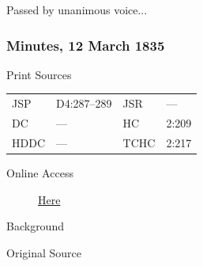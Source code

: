 				Passed by unanimous voice...
				
		\subsubsection{Minutes, 12 March 1835}
			\label{EMS-1835-JS-12-MAR-1835}
			
			\begin{description}
				\item[Print Sources]
			\end{description}

				\begin{tabular}{p{0.5in}p{1in}p{0.5in}p{1in}}
				JSP	 	& D4:287--289		& JSR 		& --- \\
				DC	 	& --- 				& HC 		& 2:209 \\
				HDDC 	& ---				& TCHC 		& 2:217 \\
				\end{tabular}
			
			\begin{description}
				\item[Online Access] \href{https://www.josephsmithpapers.org/paper-summary/minutes-12-march-1835/1}{Here}
			\end{description}
			
			\begin{description}
				\item[Background]
			\end{description}
			
			
			\begin{description}
				\item[Original Source]
			\end{description}
			
			
